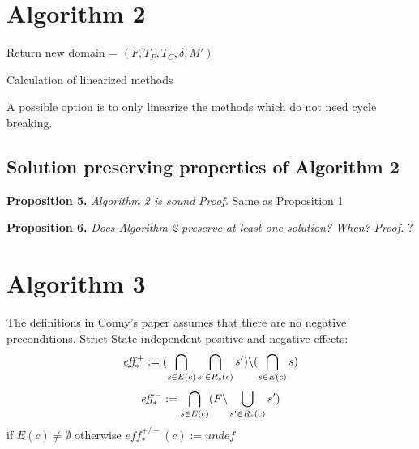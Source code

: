 \section{Algorithm 2} 
\begin{algorithm}[H]
	
	Return new domain = $(F, T_P, T_C, \delta, M')$
	\caption{Calculation of linearized methods}
\end{algorithm}

A possible option is to only linearize the methods which do not need cycle breaking.

\subsection{Solution preserving properties of Algorithm 2}
\textbf{Proposition 5.} \textit {Algorithm 2 is sound} \newline
\textit{Proof.} Same as Proposition 1


\textbf{Proposition 6.} \textit {Does Algorithm 2 preserve at least one solution? When?} \newline
\textit{Proof.} ?


\section{Algorithm 3}
The definitions in Conny's paper assumes that there are no negative preconditions.
Strict State-independent positive and negative effects:
 $$ \mathit{eff^{+}_{*}} := (\bigcap_{s \in E(c)} \bigcap_{s' \in R_s(c)} s')  \backslash  (\bigcap_{s \in E(c)} s)  $$
 $$ \mathit{eff^{-}_{*}} := \bigcap_{s \in E(c)} (F \backslash \bigcup_{s' \in R_s(c)}  s') $$
if $E(c) \neq \emptyset$ otherwise $eff^{+/-}_{*}(c) := undef$

